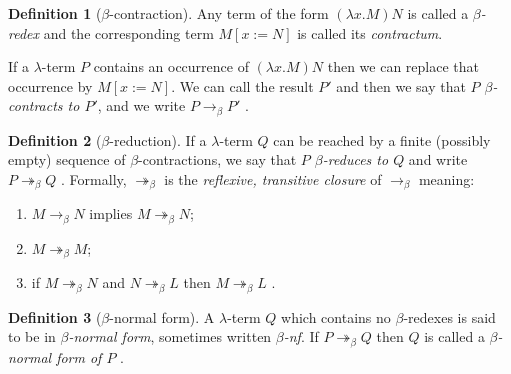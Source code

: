 \documentclass[a4paper, 11pt]{article}
\theoremstyle{plain}
\theoremstyle{definition}
\newtheorem{defn}{Definition}[section]
\theoremstyle{remark}
\newcommand\bcon{\mathrel{\rightarrow_\beta}}
\newcommand\bred{\mathrel{\twoheadrightarrow_\beta}}
\begin{document}
\begin{defn}[$\beta$-contraction]\label{def:beta-contraction}
Any term of the form $(\lambda x . M) N$ is called a \textit{$\beta$-redex} and the corresponding term $M [x := N]$ is called its \textit{contractum}.

If a $\lambda$-term $P$ contains an occurrence of $(\lambda x . M) N$ then we can replace that occurrence by $M [x := N]$. We can call the result $P'$ and then we say that \textit{$P$ $\beta$-contracts to $P'$}, and we write $P \bcon P'$ \parencites[pp.~11--12]{hindley-seldin-2008-lambda-calculus-and-combinators}[p.~23]{barendregt-1981-lambda-calculus}.
\end{defn}

\begin{defn}[$\beta$-reduction]\label{def:beta-reduction}
If a $\lambda$-term $Q$ can be reached by a finite (possibly empty) sequence of $\beta$-contractions, we say that \textit{$P$ $\beta$-reduces to $Q$} and write $P \bred Q$ \parencite[pp.~11--12]{hindley-seldin-2008-lambda-calculus-and-combinators}. Formally, $\bred$ is the \textit{reflexive, transitive closure} of $\bcon$ meaning:
\begin{enumerate}[(1)]
\item $M \bcon N$ implies $M \bred N$;
\item $M \bred M$;
\item if $M \bred N$ and $N \bred L$ then $M \bred L$ \parencite[p.~51]{barendregt-1981-lambda-calculus}.
\end{enumerate}
\end{defn}

\begin{defn}[$\beta$-normal form]\label{def:beta-normal-form}
A $\lambda$-term $Q$ which contains no $\beta$-redexes is said to be in \textit{$\beta$-normal form}, sometimes written \textit{$\beta$-nf}. If $P \bred Q$ then $Q$ is called a \textit{$\beta$-normal form of $P$} \parencites[p.~12]{hindley-seldin-2008-lambda-calculus-and-combinators}[p.~34]{barendregt-1981-lambda-calculus}.
\end{defn}
\end{document}
